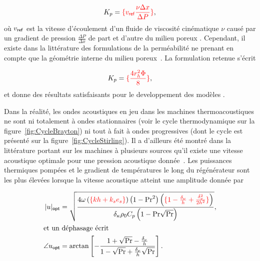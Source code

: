 \begin{equation}
	K_p = \textcolor{red}{\{v_{\sf ref}\frac{\nu \Delta x}{\Delta P}\}},
	\label{eq:DefPermeabilite_Wikipedia}
\end{equation}
où $v_{\sf ref}$ est la vitesse d'écoulement d'un fluide de viscosité cinématique $\nu$ causé par un gradient de pression $\frac{\Delta P}{\Delta x}$ de part et d'autre du milieu poreux \cite{nield_convection_2013}. Cependant, il existe dans la littérature des formulations de la perméabilité ne prenant en compte que la géométrie interne du milieu poreux~\cite{dullien_porous_1992}. La formulation retenue s'écrit

\begin{equation}
	K_p = \textcolor{red}{\{\frac{4 r_h^2 \Phi}{8}\}},
	\label{eq:DefPermeabilite_LISN}
\end{equation}
et donne des résultats satisfaisants pour le developpement des modèles \cite{hireche_experimental_2020}.\bigskip

Dans la réalité, les ondes acoustiques en jeu dans les machines thermoacoustiques ne sont ni totalement \og à ondes stationnaires \fg{} (voir le cycle thermodynamique sur la figure~\ref{fig:CycleBrayton}) ni tout à fait \og à ondes progressives \fg{} (dont le cycle est présenté sur la figure~\ref{fig:CycleStirling}). Il a d'ailleurs été montré dans la littérature portant sur les machines à plusieurs sources qu'il existe une vitesse acoustique optimale pour une pression acoustique donnée~\cite{poignand_etude_2006}. Les puissances thermiques pompées et le gradient de températures le long du régénérateur sont les plus élevées lorsque la vitesse acoustique atteint une amplitude donnée par

\begin{subequations}
	\begin{align}
		|u|_{\sf opt} &= \sqrt{\frac{4\omega\left(\textcolor{red}{\{kh+k_se_s\}}\right)\left(1-\mathrm{Pr}^2\right)\left(\textcolor{red}{\{1-\frac{\delta_\nu}{h}+\frac{\delta_\nu^2}{2h^2}\}}\right)}{\delta_\kappa \rho_0 C_p \left(1-\mathrm{Pr}\sqrt{\mathrm{Pr}}\right)}},	\label{eq:u_mag_opt_Gaelle}\\
		\intertext{et un déphasage écrit}
		\angle u_{\sf opt} &= \arctan\left[-\frac{1+\sqrt{\mathrm{Pr}}-\frac{\delta_\nu}{h}}{1-\sqrt{\mathrm{Pr}}+\frac{\delta_\nu}{h}\sqrt{\mathrm{Pr}}}\right].	\label{eq:u_arg_opt_Gaelle}
	\end{align}
	\label{eq:u_opt_Gaelle}
\end{subequations}


